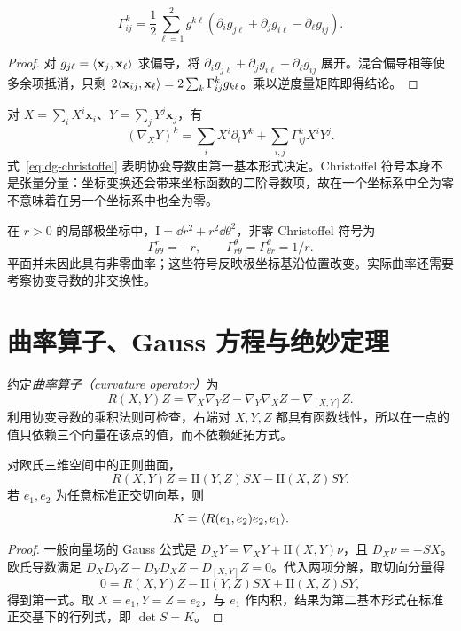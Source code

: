 \begin{proposition}
\begin{equation}
 \Gamma^k_{ij}=\frac12\sum_{\ell=1}^2g^{k\ell}
 (\partial_i g_{j\ell}+\partial_jg_{i\ell}-\partial_\ell g_{ij}).
 \label{eq:dg-christoffel}
\end{equation}
\end{proposition}
\begin{proof}
对 $g_{j\ell}=\langle \mathbf x_j,\mathbf x_\ell\rangle$ 求偏导，将 $\partial_i g_{j\ell}+\partial_jg_{i\ell}-\partial_\ell g_{ij}$ 展开。混合偏导相等使多余项抵消，只剩 $2\langle \mathbf x_{ij},\mathbf x_\ell\rangle=2\sum_k\Gamma^k_{ij}g_{k\ell}$。乘以逆度量矩阵即得结论。
\end{proof}
对 $X=\sum_iX^i\mathbf x_i$、$Y=\sum_jY^j\mathbf x_j$，有
\begin{equation}
 (\nabla_XY)^k=\sum_iX^i\partial_iY^k+
 \sum_{i,j}\Gamma^k_{ij}X^iY^j.
 \label{eq:dg-covariant-coordinates}
\end{equation}
式~\eqref{eq:dg-christoffel} 表明协变导数由第一基本形式决定。Christoffel 符号本身不是张量分量：坐标变换还会带来坐标函数的二阶导数项，故在一个坐标系中全为零不意味着在另一个坐标系中也全为零。

\begin{example}[平面的极坐标]
在 $r>0$ 的局部极坐标中，$\mathrm I=\dd r^2+r^2\dd\theta^2$，非零 Christoffel 符号为
\[
 \Gamma^r_{\theta\theta}=-r,\qquad
 \Gamma^\theta_{r\theta}=\Gamma^\theta_{\theta r}=1/r.
\]
平面并未因此具有非零曲率；这些符号反映极坐标基沿位置改变。实际曲率还需要考察协变导数的非交换性。
\end{example}

\section{曲率算子、Gauss 方程与绝妙定理}
\begin{definition}[曲率算子]
约定\emph{曲率算子（curvature operator）}为
\[
 R(X,Y)Z=\nabla_X\nabla_YZ-\nabla_Y\nabla_XZ-\nabla_{[X,Y]}Z.
\]
利用协变导数的乘积法则可检查，右端对 $X,Y,Z$ 都具有函数线性，所以在一点的值只依赖三个向量在该点的值，而不依赖延拓方式。
\end{definition}

\begin{theorem}[Gauss 方程]
对欧氏三维空间中的正则曲面，
\begin{equation}
 R(X,Y)Z=\mathrm{II}(Y,Z)SX-\mathrm{II}(X,Z)SY.
 \label{eq:dg-gauss-equation}
\end{equation}
若 $e_1,e_2$ 为任意标准正交切向基，则
\begin{equation}
 K=\langle R(e_1,e_2)e_2,e_1\rangle.
 \label{eq:dg-intrinsic-K}
\end{equation}
\label{thm:dg-gauss}
\end{theorem}
\begin{proof}
一般向量场的 Gauss 公式是 $D_XY=\nabla_XY+\mathrm{II}(X,Y)\nu$，且 $D_X\nu=-SX$。欧氏导数满足 $D_XD_YZ-D_YD_XZ-D_{[X,Y]}Z=0$。代入两项分解，取切向分量得
\[
 0=R(X,Y)Z-\mathrm{II}(Y,Z)SX+\mathrm{II}(X,Z)SY,
\]
得到第一式。取 $X=e_1,Y=Z=e_2$，与 $e_1$ 作内积，结果为第二基本形式在标准正交基下的行列式，即 $\det S=K$。
\end{proof}

